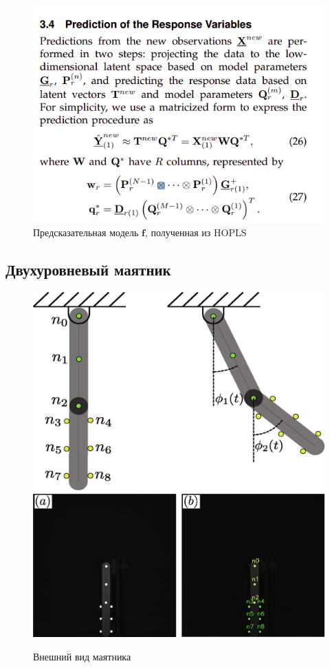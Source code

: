\documentclass[a4paper,14pt]{article}
\renewcommand{\bf}{\mathbf{f}}
\theoremstyle{plain} %
\theoremstyle{definition} %
\theoremstyle{remark} %
\begin{document}
	\begin{figure}[bhtp]
		\centering
		\includegraphics[width=0.8\linewidth]{hopls_prediction_model.png}
		\caption{Предсказательная модель $\bf$, полученная из HOPLS}
	\end{figure}

	\subsection{Двухуровневый маятник}
	\begin{figure}[bhtp]
		\centering
		\includegraphics[width=0.9\linewidth]{complete_pendulum.jpg}
		\includegraphics[width=0.9\linewidth]{double_pendulum}
		\caption{Внешний вид маятника}
	\end{figure}
\end{document}
